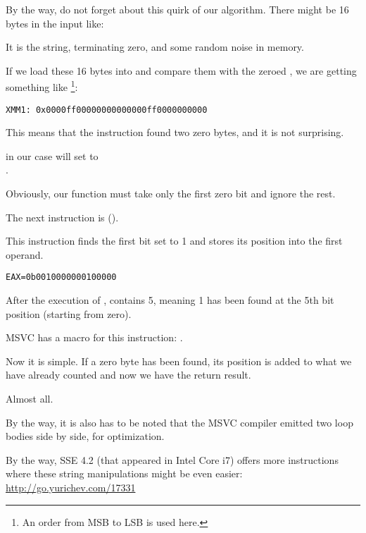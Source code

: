 By the way, do not forget about this quirk of our algorithm.
There might be 16 bytes in the input like:



It is the  string, terminating zero, and some random noise in memory.

If we load these 16 bytes into  and compare them with the zeroed , 
we are getting something like
\footnote{An order from \ac{MSB} to \ac{LSB} is used here.}:

\begin{verbatim}
XMM1: 0x0000ff00000000000000ff0000000000
\end{verbatim}

This means that the instruction found two zero bytes, and it is not surprising.
 
 in our case will set \EAX to\\
.

Obviously, our function must take only the first zero bit and ignore the rest.

\label{instruction_BSF}
The next instruction is  (). 

This instruction finds the first bit set to 1 and stores its position into the first operand.

\begin{verbatim}
EAX=0b0010000000100000
\end{verbatim}

After the execution of , \EAX contains 5, meaning 
1 has been found at the 5th bit position (starting from zero).

MSVC has a macro for this instruction: .

Now it is simple. If a zero byte has been found, its position is added to what we have already counted and now we have 
the return result.

Almost all.

By the way, it is also has to be noted that the MSVC compiler emitted two loop bodies side by side, for optimization.

By the way, SSE 4.2 (that appeared in Intel Core i7) offers more instructions where these string manipulations might be
even easier: \url{http://go.yurichev.com/17331}
